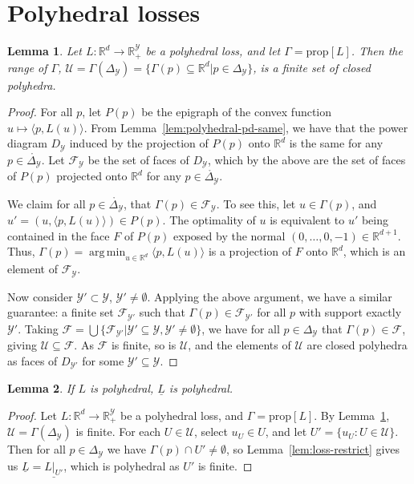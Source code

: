 \documentclass[12pt]{article}
\newcommand{\Comments}{1}
\newcommand{\mytodo}[2]{\ifnum\Comments=1%
  \todo[linecolor=#1!80!black,backgroundcolor=#1,bordercolor=#1!80!black]{#2}\fi}
\newcommand{\btw}[1]{}%
\newcommand{\reals}{\mathbb{R}}
\newcommand{\prop}[1]{\mathrm{prop}[#1]}
\newcommand{\simplex}{\Delta_\Y}
\newcommand{\F}{\mathcal{F}}
\newcommand{\U}{\mathcal{U}}
\newcommand{\Y}{\mathcal{Y}}
\newcommand{\risk}[1]{\underline{#1}}
\newcommand{\inprod}[2]{\langle #1, #2 \rangle}%
\newcommand{\inter}[1]{\mathring{#1}}%
\DeclareMathOperator*{\argmin}{arg\,min}
\newtheorem{lemma}{Lemma}
\begin{document}
\section{Polyhedral losses}\label{app:polyhedral-losses}
\begin{lemma}
  \label{lem:polyhedral-range-gamma}
  Let $L:\reals^d\to\reals_+^\Y$ be a polyhedral loss, and let $\Gamma = \prop{L}$.
  Then the range of $\Gamma$, $\U = \Gamma(\simplex) = \{\Gamma(p) \subseteq \reals^d | p\in\simplex\}$, is a finite set of closed polyhedra.
\end{lemma}
\begin{proof}
  For all $p$, let $P(p)$ be the epigraph of the convex function $u\mapsto \inprod{p}{L(u)}$.
  From Lemma~\ref{lem:polyhedral-pd-same}, we have that the power diagram $D_\Y$ induced by the projection of $P(p)$ onto $\reals^d$ is the same for any $p\in\inter\simplex$.
  Let $\F_\Y$ be the set of faces of $D_\Y$, which by the above are the set of faces of $P(p)$ projected onto $\reals^d$ for any $p\in\inter\simplex$.

  We claim for all $p\in\inter\simplex$, that $\Gamma(p) \in \F_\Y$.
  To see this, let $u \in \Gamma(p)$, and $u' = (u,\inprod{p}{L(u)}) \in P(p)$.
  The optimality of $u$ is equivalent to $u'$ being contained in the face $F$ of $P(p)$ exposed by the normal $(0,\ldots,0,-1)\in\reals^{d+1}$.
  Thus, $\Gamma(p) = \argmin_{u\in\reals^d} \inprod{p}{L(u)}$ is a projection of $F$ onto $\reals^d$, which is an element of $\F_\Y$.

  Now consider $\Y'\subset \Y$, $\Y'\neq\emptyset$.
  Applying the above argument, we have a similar guarantee: a finite set $\F_{\Y'}$ such that $\Gamma(p) \in \F_{\Y'}$ for all $p$ with support exactly $\Y'$.
  Taking $\F = \bigcup\{\F_{\Y'} | \Y'\subseteq\Y, \Y'\neq\emptyset\}$, we have for all $p\in\simplex$ that $\Gamma(p) \in \F$, giving $\U \subseteq \F$.
  As $\F$ is finite, so is $\U$, and the elements of $\U$ are closed polyhedra as faces of $D_{\Y'}$ for some $\Y'\subseteq\Y$.
\end{proof}

\begin{lemma}
  \label{lem:poly-loss-poly-risk}
  If $L$ is polyhedral, $\risk{L}$ is polyhedral.
\end{lemma}
\begin{proof}
  Let $L:\reals^d\to\reals_+^\Y$ be a polyhedral loss, and $\Gamma = \prop{L}$.
  By Lemma~\ref{lem:polyhedral-range-gamma}, $\U = \Gamma(\simplex)$ is finite.
  For each $U\in \U$, select $u_U \in U$, and let $U' = \{u_U : U \in\U\}$.
  Then for all $p\in\simplex$ we have $\Gamma(p) \cap U' \neq \emptyset$, so Lemma~\ref{lem:loss-restrict} gives us $\risk{L} = \risk{L|_{U'}}$, which is polyhedral as $U'$ is finite.
  \btw{RF: interesting: we didn't need Proposition~\ref{prop:embed-risk-poly} after all.  This already gives the discrete loss $L$ embeds!}
\end{proof}
\end{document}
